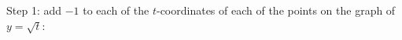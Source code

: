 \documentclass{ximera}
\begin{document}
\begin{example}
\begin{enumerate}
Step 1:   add $-1$ to each of the $t$-coordinates of each of the points on the graph of $y=\sqrt{t}$:















\end{enumerate}
\end{example}
\end{document}
